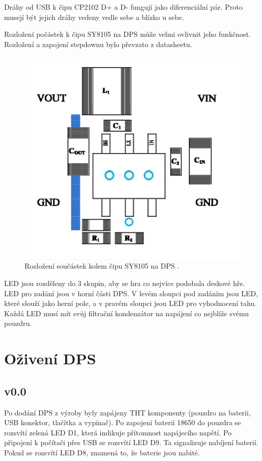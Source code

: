 Dráhy od USB k čipu CP2102 D+ a D- fungují jako diferenciální pár. Proto musejí být jejich dráhy vedeny vedle sebe a blízko u 
sebe.

Rozložení počástek k čipu SY8105 na DPS může velmi ovlivnit jeho funkčnost. Rozložení a zapojení stepdownu 
bylo převzato z datasheetu.

\begin{figure}[!h]
  \begin{center}
    \includegraphics[scale=0.5]{obrazky/SY8105_rozlozeni_na_DPS.png}
  \end{center}
  \caption[SY8105 rozložení na DPS]{Rozložení součástek kolem čipu SY8105 na DPS \cite{SY8105_datasheet}.}
\end{figure}

LED jsou rozděleny do 3 skupin, aby se hra co nejvíce podobala deskové hře. LED pro zadání jsou v horní části DPS. V levém 
sloupci pod zadáním jsou LED, které slouží jako herní pole, a v pravém sloupci jsou LED pro vyhodnocení tahu. Každá LED musí 
mít svůj filtrační kondenzátor na napájení co nejblíže svému pouzdru.

\chapter{Oživení DPS}
\section{v0.0}
Po dodání DPS z výroby byly zapájeny THT komponenty (pouzdro na baterii, USB konektor, tlačítka a vypínač). Po zapojení baterií
18650 do pouzdra se rozsvítí zelená LED D1, která indikuje přítomnost napájecího napětí. Po připojení k počítači přes USB
se rozsvítí LED D9. Ta signalizuje nabíjení baterií. Pokud se rozsvítí LED D8, znamená to, že baterie jsou nabité.

